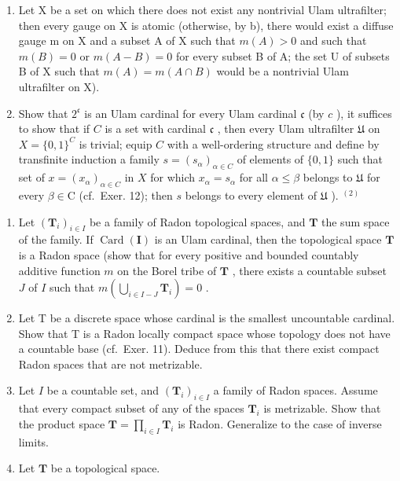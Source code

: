 \begin{enumerate}
\def\labelenumi{\alph{enumi})}
\setcounter{enumi}{2}
\item
  Let X be a set on which there does not exist any nontrivial Ulam ultrafilter; then every gauge on X is atomic (otherwise, by b), there would exist a diffuse gauge m on X and a subset A of X such that \(m(A) > 0\) and such that \(m(B) = 0\) or \(m(A - B) = 0\) for every subset B of A; the set U of subsets B of X such that \(m(A) = m(A \cap B)\) would be a nontrivial Ulam ultrafilter on X).
\item
  Show that \(2^{\mathfrak{c}}\) is an Ulam cardinal for every Ulam cardinal \(\mathfrak{c}\) (by \(c\) ), it suffices to show that if \(C\) is a set with cardinal \(\mathfrak{c}\) , then every Ulam ultrafilter \(\mathfrak{U}\) on \(X = \{0,1\}^{C}\) is trivial; equip \(C\) with a well-ordering structure and define by transfinite induction a family \(s = (s_{\alpha})_{\alpha \in C}\) of elements of \(\{0,1\}\) such that set of \(x = (x_{\alpha})_{\alpha \in C}\) in \(X\) for which \(x_{\alpha}=s_{\alpha}\) for all \(\alpha\leqslant\beta\) belongs to \(\mathfrak{U}\) for every \(\beta\in\mathrm{C}\) (cf.~Exer. 12); then \(s\) belongs to every element of \(\mathfrak{U}\) ). \(^{(2)}\)
\end{enumerate}

\begin{enumerate}
\def\labelenumi{\arabic{enumi})}
\setcounter{enumi}{13}
\item
  Let \((\mathbf{T}_i)_{i\in I}\) be a family of Radon topological spaces, and \(\mathbf{T}\) the sum space of the family. If \(\operatorname{Card}(\mathbf{I})\) is an Ulam cardinal, then the topological space \(\mathbf{T}\) is a Radon space (show that for every positive and bounded countably additive function \(m\) on the Borel tribe of \(\mathbf{T}\) , there exists a countable subset \(J\) of \(I\) such that \(m(\bigcup_{i \in I - J} \mathbf{T}_i) = 0\) .
\item
  Let T be a discrete space whose cardinal is the smallest uncountable cardinal. Show that T is a Radon locally compact space whose topology does not have a countable base (cf.~Exer. 11). Deduce from this that there exist compact Radon spaces that are not metrizable.
\item
  Let \(I\) be a countable set, and \((\mathbf{T}_i)_{i \in I}\) a family of Radon spaces. Assume that every compact subset of any of the spaces \(\mathbf{T}_i\) is metrizable. Show that the product space \(\mathbf{T} = \prod_{i \in I} \mathbf{T}_i\) is Radon. Generalize to the case of inverse limits.
\item
  Let \(\mathbf{T}\) be a topological space.
\end{enumerate}

